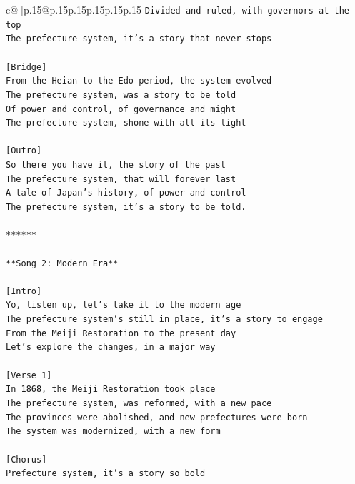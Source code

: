 \documentclass{article}
\begin{document}
{\begin{supertabular}{c@{$\;$}|p{.15\linewidth}@{}p{.15\linewidth}p{.15\linewidth}p{.15\linewidth}p{.15\linewidth}p{.15\linewidth}}
{{{\texttt{Divided and ruled, with governors at the top} \\
\texttt{The prefecture system, it's a story that never stops} \\
\\ 
\texttt{{[}Bridge{]}} \\
\texttt{From the Heian to the Edo period, the system evolved} \\
\texttt{The prefecture system, was a story to be told} \\
\texttt{Of power and control, of governance and might} \\
\texttt{The prefecture system, shone with all its light} \\
\\ 
\texttt{{[}Outro{]}} \\
\texttt{So there you have it, the story of the past} \\
\texttt{The prefecture system, that will forever last} \\
\texttt{A tale of Japan's history, of power and control} \\
\texttt{The prefecture system, it's a story to be told.} \\
\\ 
\texttt{******} \\
\\ 
\texttt{**Song 2: Modern Era**} \\
\\ 
\texttt{{[}Intro{]}} \\
\texttt{Yo, listen up, let's take it to the modern age} \\
\texttt{The prefecture system's still in place, it's a story to engage} \\
\texttt{From the Meiji Restoration to the present day} \\
\texttt{Let's explore the changes, in a major way} \\
\\ 
\texttt{{[}Verse 1{]}} \\
\texttt{In 1868, the Meiji Restoration took place} \\
\texttt{The prefecture system, was reformed, with a new pace} \\
\texttt{The provinces were abolished, and new prefectures were born} \\
\texttt{The system was modernized, with a new form} \\
\\ 
\texttt{{[}Chorus{]}} \\
\texttt{Prefecture system, it's a story so bold} \\
}}}
\end{supertabular}}
\end{document}
